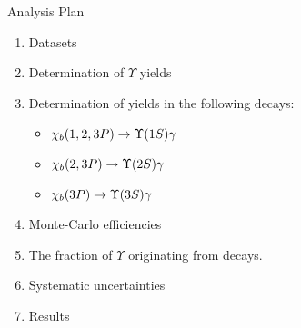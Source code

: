 \begin{frame}{Analysis Plan}
\begin{enumerate}
\item Datasets
\item Determination of $\Upsilon$ yields
\item Determination of \chib yields in the following decays:
\begin{itemize}
    \item $\chi_b(1,2,3P) \to \OneS \gamma$
    \item $\chi_b(2,3P) \to \TwoS \gamma$
    \item $\chi_b(3P) \to \ThreeS \gamma$
\end{itemize}
\item Monte-Carlo efficiencies
\item The fraction of $\Upsilon$ originating from \chib decays.
\item Systematic uncertainties 
\item Results
\end{enumerate}
\end{frame}
